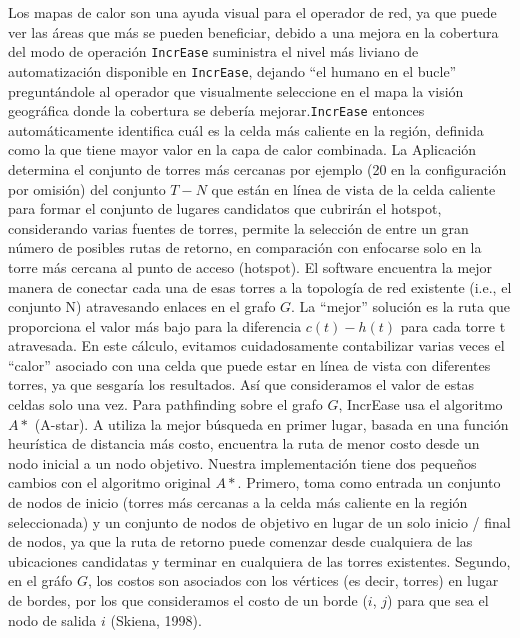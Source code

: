 \documentclass[]{article}
\begin{document}
Los mapas de calor son una ayuda visual para el operador de red, ya que
puede ver las áreas que más se pueden beneficiar, debido a una mejora en
la cobertura del modo de operación \texttt{IncrEase} suministra el nivel
más liviano de automatización disponible en \texttt{IncrEase}, dejando
``el humano en el bucle'' preguntándole al operador que visualmente
seleccione en el mapa la visión geográfica donde la cobertura se debería
mejorar.\texttt{IncrEase} entonces automáticamente identifica cuál es la
celda más caliente en la región, definida como la que tiene mayor valor
en la capa de calor combinada. La Aplicación determina el conjunto de
torres más cercanas por ejemplo (20 en la configuración por omisión) del
conjunto \(T-N\) que están en línea de vista de la celda caliente para
formar el conjunto de lugares candidatos que cubrirán el hotspot,
considerando varias fuentes de torres, permite la selección de entre un
gran número de posibles rutas de retorno, en comparación con enfocarse
solo en la torre más cercana al punto de acceso (hotspot). El software
encuentra la mejor manera de conectar cada una de esas torres a la
topología de red existente (i.e., el conjunto N) atravesando enlaces en
el grafo \(G\). La ``mejor'' solución es la ruta que proporciona el
valor más bajo para la diferencia \(c(t) - h(t)\) para cada torre t
atravesada. En este cálculo, evitamos cuidadosamente contabilizar varias
veces el ``calor'' asociado con una celda que puede estar en línea de
vista con diferentes torres, ya que sesgaría los resultados. Así que
consideramos el valor de estas celdas solo una vez. Para pathfinding
sobre el grafo \(G\), IncrEase usa el algoritmo \(A *\) (A-star). A
utiliza la mejor búsqueda en primer lugar, basada en una función
heurística de distancia más costo, encuentra la ruta de menor costo
desde un nodo inicial a un nodo objetivo. Nuestra implementación tiene
dos pequeños cambios con el algoritmo original \(A *\). Primero, toma
como entrada un conjunto de nodos de inicio (torres más cercanas a la
celda más caliente en la región seleccionada) y un conjunto de nodos de
objetivo en lugar de un solo inicio / final de nodos, ya que la ruta de
retorno puede comenzar desde cualquiera de las ubicaciones candidatas y
terminar en cualquiera de las torres existentes. Segundo, en el gráfo
\(G\), los costos son asociados con los vértices (es decir, torres) en
lugar de bordes, por los que consideramos el costo de un borde (\(i\),
\(j\)) para que sea el nodo de salida \(i\) (Skiena, 1998).
\end{document}
